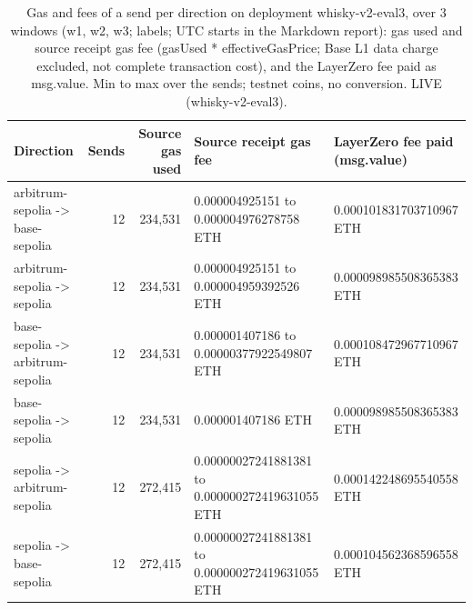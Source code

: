 \begin{table}[htbp]
    \centering
    \small
    \begin{tabular}{lrrll}
    \toprule
    Direction & Sends & Source gas used & Source receipt gas fee & LayerZero fee paid (msg.value) \\
    \midrule
    arbitrum-sepolia -> base-sepolia & 12 & 234,531 & 0.000004925151 to 0.000004976278758 ETH & 0.000101831703710967 ETH \\
    arbitrum-sepolia -> sepolia & 12 & 234,531 & 0.000004925151 to 0.000004959392526 ETH & 0.000098985508365383 ETH \\
    base-sepolia -> arbitrum-sepolia & 12 & 234,531 & 0.000001407186 to 0.00000377922549807 ETH & 0.000108472967710967 ETH \\
    base-sepolia -> sepolia & 12 & 234,531 & 0.000001407186 ETH & 0.000098985508365383 ETH \\
    sepolia -> arbitrum-sepolia & 12 & 272,415 & 0.00000027241881381 to 0.000000272419631055 ETH & 0.000142248695540558 ETH \\
    sepolia -> base-sepolia & 12 & 272,415 & 0.00000027241881381 to 0.000000272419631055 ETH & 0.000104562368596558 ETH \\
    \bottomrule
    \end{tabular}
    \caption{Gas and fees of a send per direction on deployment whisky-v2-eval3, over 3 windows (w1, w2, w3; labels; UTC starts in the Markdown report): gas used and source receipt gas fee (gasUsed * effectiveGasPrice; Base L1 data charge excluded, not complete transaction cost), and the LayerZero fee paid as msg.value. Min to max over the sends; testnet coins, no conversion. LIVE (whisky-v2-eval3).}
    \label{tab:send-cost}
\end{table}
